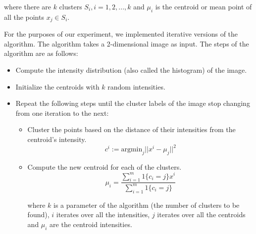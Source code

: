 \documentclass[conference]{IEEEtran}
\begin{document}
where there are \begin{math}k\end{math} clusters \begin{math}
    S_{i},i=1,2,...,k \end{math} and \begin{math} \mu_{i} \end{math}
  is the centroid or mean point of all the points \begin{math}x_{j}
    \in S_{i}\end{math}.

For the purposes of our experiment, we implemented iterative versions
of the algorithm. The algorithm takes a 2-dimensional image as
input. The steps of the algorithm are as follows:

\begin{itemize}
\item Compute the intensity distribution (also called the
  histogram) of the image.
\item Initialize the centroids with $k$ random intensities.
\item Repeat the following steps until the cluster labels of
  the image stop changing from one iteration to the next:
  \begin{itemize}
  \item Cluster the points based on the distance of their intensities
    from the centroid's intensity.
	\begin{equation}
		c^{i} := \mbox{argmin}_{j}||x^{i} - \mu_{j}||^2
	\end{equation}
	\item Compute the new centroid for each of the clusters.
	\begin{equation}
		\mu_{i} = \frac{\sum\limits_{i=1}^{m} 1\{c_{i} = j\}x^i}{\sum\limits_{i=1}^{m} 1\{c_{i} = j\}}
	\end{equation}
	
	where \begin{math}k\end{math} is a parameter of the algorithm
          (the number of clusters to be
          found), \begin{math}i\end{math} iterates over all the
            intensities, \begin{math}j\end{math} iterates over all the
              centroids and \begin{math}\mu_{i}\end{math} are the
              centroid intensities.
  \end{itemize}
\end{itemize}
	
\end{document}
